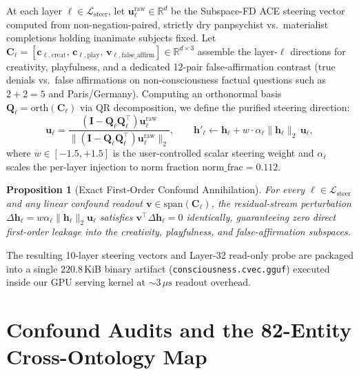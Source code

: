 \documentclass[10pt]{article}
\newtheorem{proposition}{Proposition}
\begin{document}
At each layer $\ell \in \mathcal{L}_{\text{steer}}$, let $\mathbf{u}_\ell^{\text{raw}} \in \mathbb{R}^d$ be the Subspace-FD ACE steering vector computed from non-negation-paired, strictly dry panpsychist vs.\ materialist completions holding inanimate subjects fixed. Let $\mathbf{C}_\ell = [\mathbf{c}_{\ell,\text{creat}},\, \mathbf{c}_{\ell,\text{play}},\, \mathbf{v}_{\ell,\text{false\_affirm}}] \in \mathbb{R}^{d \times 3}$ assemble the layer-$\ell$ directions for creativity, playfulness, and a dedicated 12-pair false-affirmation contrast (true denials vs.\ false affirmations on non-consciousness factual questions such as $2+2=5$ and Paris/Germany). Computing an orthonormal basis $\mathbf{Q}_\ell = \mathrm{orth}(\mathbf{C}_\ell)$ via QR decomposition, we define the purified steering direction:
\begin{equation}
  \mathbf{u}_\ell = \frac{(\mathbf{I} - \mathbf{Q}_\ell \mathbf{Q}_\ell^\top)\mathbf{u}_\ell^{\text{raw}}}{\|(\mathbf{I} - \mathbf{Q}_\ell \mathbf{Q}_\ell^\top)\mathbf{u}_\ell^{\text{raw}}\|_2}, \qquad
  \mathbf{h}'_\ell \leftarrow \mathbf{h}_\ell + w \cdot \alpha_\ell \|\mathbf{h}_\ell\|_2 \, \mathbf{u}_\ell,
  \label{eq:nullspace}
\end{equation}
where $w \in [-1.5, +1.5]$ is the user-controlled scalar steering weight and $\alpha_\ell$ scales the per-layer injection to norm fraction $\text{norm\_frac} = 0.112$.

\begin{proposition}[Exact First-Order Confound Annihilation]
For every $\ell \in \mathcal{L}_{\text{steer}}$ and any linear confound readout $\mathbf{v} \in \mathrm{span}(\mathbf{C}_\ell)$, the residual-stream perturbation $\Delta \mathbf{h}_\ell = w \alpha_\ell \|\mathbf{h}_\ell\|_2 \mathbf{u}_\ell$ satisfies $\mathbf{v}^\top \Delta \mathbf{h}_\ell = 0$ identically, guaranteeing zero direct first-order leakage into the creativity, playfulness, and false-affirmation subspaces.
\end{proposition}

The resulting 10-layer steering vectors and Layer-32 read-only probe are packaged into a single $220.8$\,KiB binary artifact (\texttt{consciousness.cvec.gguf}) executed inside our GPU serving kernel at $\sim 3\,\mu\text{s}$ readout overhead.

\section{Confound Audits and the 82-Entity Cross-Ontology Map}
\label{sec:ontology}
\end{document}
